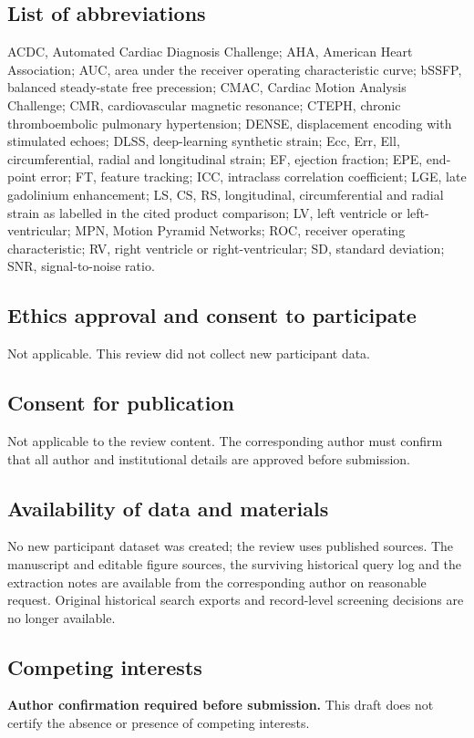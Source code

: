 \documentclass[11pt,a4paper]{article}
\begin{document}
\subsection*{List of abbreviations}
ACDC, Automated Cardiac Diagnosis Challenge; AHA, American Heart Association; AUC, area under the receiver operating characteristic curve; bSSFP, balanced steady-state free precession; CMAC, Cardiac Motion Analysis Challenge; CMR, cardiovascular magnetic resonance; CTEPH, chronic thromboembolic pulmonary hypertension; DENSE, displacement encoding with stimulated echoes; DLSS, deep-learning synthetic strain; Ecc, Err, Ell, circumferential, radial and longitudinal strain; EF, ejection fraction; EPE, end-point error; FT, feature tracking; ICC, intraclass correlation coefficient; LGE, late gadolinium enhancement; LS, CS, RS, longitudinal, circumferential and radial strain as labelled in the cited product comparison; LV, left ventricle or left-ventricular; MPN, Motion Pyramid Networks; ROC, receiver operating characteristic; RV, right ventricle or right-ventricular; SD, standard deviation; SNR, signal-to-noise ratio.

\subsection*{Ethics approval and consent to participate}
Not applicable. This review did not collect new participant data.

\subsection*{Consent for publication}
Not applicable to the review content. The corresponding author must confirm that all author and institutional details are approved before submission.

\subsection*{Availability of data and materials}
No new participant dataset was created; the review uses published sources. The manuscript and editable figure sources, the surviving historical query log and the extraction notes are available from the corresponding author on reasonable request. Original historical search exports and record-level screening decisions are no longer available.

\subsection*{Competing interests}
\textbf{Author confirmation required before submission.} This draft does not certify the absence or presence of competing interests.
\end{document}
